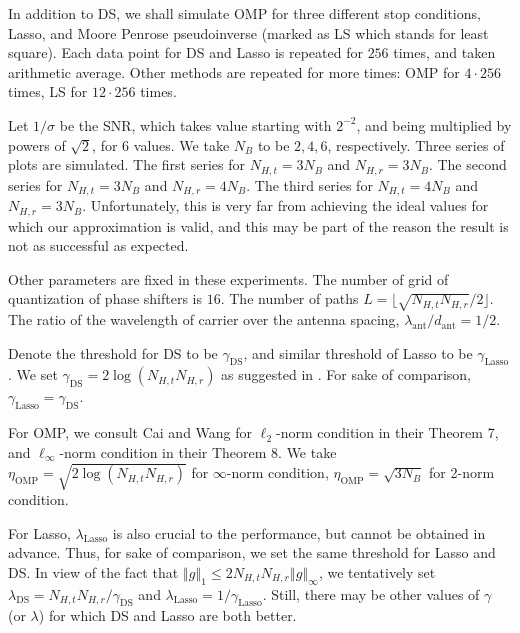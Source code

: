 \documentclass[journal]{IEEEtran}
\newcommand {\g} {\gamma}
\newcommand {\h} {\eta}
\renewcommand {\l} {\lambda}
\newcommand {\s} {\sigma}
\newcommand {\D} {\cdot}
\newcommand {\m} [1] {\( #1 \)}
\newcommand {\RB} [1] {\left( #1 \right)}
\newcommand {\VNm} [1] {\left \Vert #1 \right \Vert}
\newcommand {\R} [1] {\sqrt {#1}}
\begin{document}
{In addition to DS, we shall simulate OMP for three different stop conditions, Lasso, and Moore Penrose pseudoinverse (marked as LS which stands for least square).
Each data point for DS and Lasso is repeated for \m {256} times, and taken arithmetic average.
Other methods are repeated for more times: OMP for \m {4 \D 256} times, LS for \m {12 \D 256} times.

Let \m {1/\s} be the SNR, which takes value starting with \m {2^{-2}}, and being multiplied by powers of \m {\R {2}}, for \m {6} values.
We take \m {N_B} to be \m {2, 4, 6}, respectively.
Three series of plots are simulated.
The first series for \m {N_{H,t} = 3 N_B} and \m {N_{H,r} = 3 N_B}.
The second series for \m {N_{H,t} = 3 N_B} and \m {N_{H,r} = 4 N_B}.
The third series for \m {N_{H,t} = 4 N_B} and \m {N_{H,r} = 3 N_B}.
Unfortunately, this is very far from achieving the ideal values for which our approximation is valid, and this may be part of the reason the result is not as successful as expected.

Other parameters are fixed in these experiments.
The number of grid of quantization of phase shifters is \m {16}.
The number of paths \m {L = \lfloor \R {N_{H,t} N_{H,r}} / 2 \rfloor}.
The ratio of the wavelength of carrier over the antenna spacing, \m {\l _{\mathrm {ant}} / d _{\mathrm {ant}} = 1 / 2}.

Denote the threshold for DS to be \m {\g_{\mathrm {DS}}}, and similar threshold of Lasso to be \m {\g_{\mathrm {Lasso}}}.
We set \m {\g_{\mathrm {DS}} = 2 \log \RB {N_{H,t} N_{H,r}}} as suggested in \cite {CaT07}.
For sake of comparison, \m {\g_{\mathrm {Lasso}} = \g_{\mathrm {DS}}}.

For OMP, we consult Cai and Wang \cite {CaW11} for \m {\ell _2}-norm condition in their Theorem 7, and \m {\ell _\infty}-norm condition in their Theorem 8.
We take \m {\h_{\mathrm {OMP}} = \R {2 \log \RB {N_{H,t} N_{H,r}}}} for \m {\infty}-norm condition, \m {\h_{\mathrm {OMP}} = \R {3 N_B}} for 2-norm condition.

For Lasso, \m {\l _{\mathrm {Lasso}}} is also crucial to the performance, but cannot be obtained in advance.
Thus, for sake of comparison, we set the same threshold for Lasso and DS.
In view of the fact that \m {\VNm {g} _1 \leq 2 N_{H,t} N_{H,r} \VNm {g} _\infty}, we tentatively set \m {\l _{\mathrm {DS}} =  N_{H,t} N_{H,r} / \g _{\mathrm {DS}}} and \m {\l _{\mathrm {Lasso}} =  1 / \g _{\mathrm {Lasso}}}.
Still, there may be other values of \m {\g} (or \m {\l}) for which DS and Lasso are both better.

}
\end{document}
